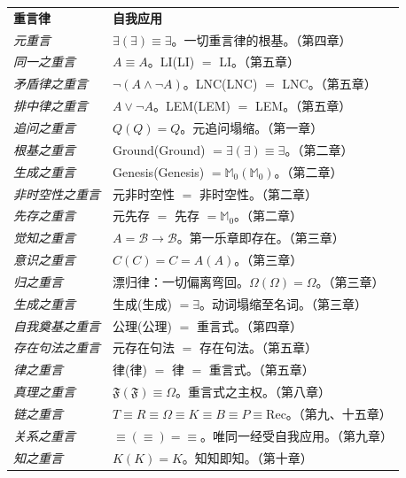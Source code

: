 \documentclass[10pt, openany, oneside]{book}
\renewcommand{\footnotesize}{\fontsize{8.5}{11}\selectfont}
\begin{document}
{\footnotesize
\noindent\begin{tabular}{@{} p{} @{\hspace{0.5em}} p{} @{}}
\textbf{重言律} & \textbf{自我应用} \\[0.5em]
\textit{元重言} & $\exists(\exists) \equiv \exists$。一切重言律的根基。（第四章）\\[0.3em]
\textit{同一之重言} & $A \equiv A$。LI(LI) $=$ LI。（第五章）\\[0.3em]
\textit{矛盾律之重言} & $\neg(A \wedge \neg A)$。LNC(LNC) $=$ LNC。（第五章）\\[0.3em]
\textit{排中律之重言} & $A \vee \neg A$。LEM(LEM) $=$ LEM。（第五章）\\[0.3em]
\textit{追问之重言} & $Q(Q) = Q$。元追问塌缩。（第一章）\\[0.3em]
\textit{根基之重言} & Ground(Ground) $= \exists(\exists) \equiv \exists$。（第二章）\\[0.3em]
\textit{生成之重言} & Genesis(Genesis) $= \mathbb{M}_0(\mathbb{M}_0)$。（第二章）\\[0.3em]
\textit{非时空性之重言} & 元非时空性 $=$ 非时空性。（第二章）\\[0.3em]
\textit{先存之重言} & 元先存 $=$ 先存 $= \mathbb{M}_0$。（第二章）\\[0.3em]
\textit{觉知之重言} & $A = \mathcal{B} \to \mathcal{B}$。第一乐章即存在。（第三章）\\[0.3em]
\textit{意识之重言} & $C(C) = C = A(A)$。（第三章）\\[0.3em]
\textit{归之重言} & 漂归律：一切偏离弯回。$\Omega(\Omega) = \Omega$。（第三章）\\[0.3em]
\textit{生成之重言} & 生成(生成) $= \exists$。动词塌缩至名词。（第三章）\\[0.3em]
\textit{自我奠基之重言} & 公理(公理) $=$ 重言式。（第四章）\\[0.3em]
\textit{存在句法之重言} & 元存在句法 $=$ 存在句法。（第五章）\\[0.3em]
\textit{律之重言} & 律(律) $=$ 律 $=$ 重言式。（第五章）\\[0.3em]
\textit{真理之重言} & $\mathfrak{F}(\mathfrak{F}) \equiv \Omega$。重言式之主权。（第八章）\\[0.3em]
\textit{链之重言} & $T \equiv R \equiv \Omega \equiv K \equiv B \equiv P \equiv \text{Rec}$。（第九、十五章）\\[0.3em]
\textit{关系之重言} & $\equiv(\equiv) = \equiv$。唯同一经受自我应用。（第九章）\\[0.3em]
\textit{知之重言} & $K(K) = K$。知知即知。（第十章）\\[0.3em]

\end{tabular}}
\end{document}
